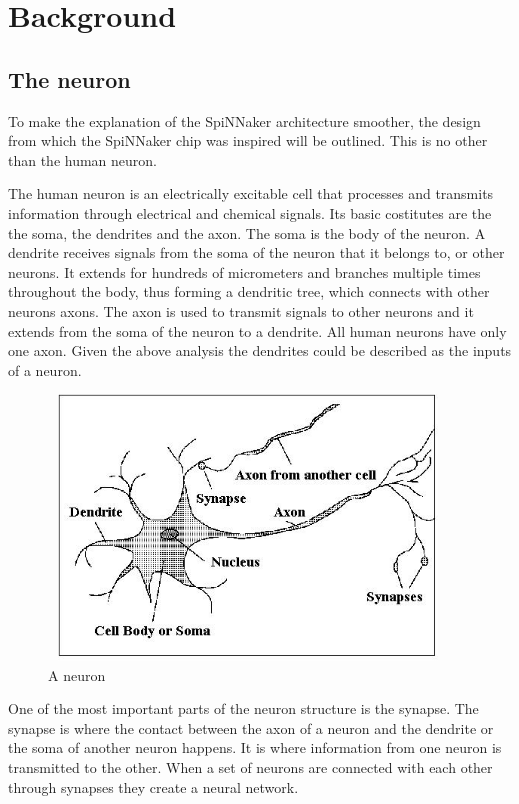 \documentclass[12pt,a4paper]{article}
\begin{document}
\section{Background}
\subsection{The neuron}
To make the explanation of the SpiNNaker architecture smoother, the design from which the SpiNNaker chip was inspired will be outlined. This is no other than the human neuron.

The human neuron is an electrically excitable cell that processes and transmits information through electrical and chemical signals. Its basic costitutes are the the soma, the dendrites and the axon. The soma is the body of the neuron. A dendrite receives signals from the soma of the neuron that it belongs to, or other neurons. It extends for hundreds of micrometers and branches multiple times throughout the body, thus forming a dendritic tree, which connects with other neurons axons. The axon is used to transmit signals to other neurons and it extends from the soma of the neuron to a dendrite. All human neurons have only one axon. Given the above analysis the dendrites could be described as the inputs of a neuron.
\\[0.5cm]
\begin{figure}[h!]
\includegraphics[width=300pt,height=200pt,scale=2]{Pics/neuron.jpg}
\centering
\caption{A neuron}
\end{figure}

One of the most important parts of the neuron structure is the synapse. The synapse is where the contact between the axon of a neuron and the dendrite or the soma of another neuron happens. It is where information from one neuron is transmitted to the other. When a set of neurons are connected with each other through synapses they create a neural network.
\end{document}
